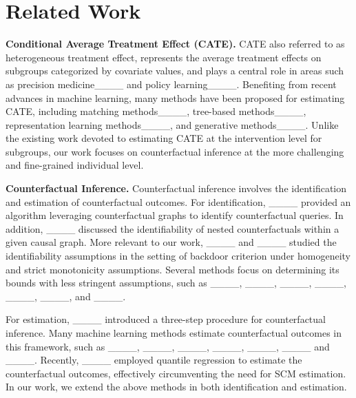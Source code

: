 \section{Related Work}
{\bf Conditional Average Treatment Effect (CATE).} 
 CATE also referred to as heterogeneous treatment effect, represents the average treatment effects on subgroups categorized by covariate values, and plays a central role in areas such as precision medicine____ and policy learning____. Benefiting from recent advances in machine learning, many methods have been proposed for estimating CATE, including matching methods____, tree-based methods____, representation learning methods____, and generative methods____. Unlike the existing work devoted to estimating CATE at the intervention level for subgroups, our work focuses on counterfactual inference at the more challenging and fine-grained individual level.
 
 
{\bf Counterfactual Inference.} Counterfactual inference involves the identification and estimation of counterfactual outcomes.
  For identification,  ____ provided an algorithm  leveraging counterfactual graphs to identify counterfactual queries. In addition, ____ discussed the identifiability of nested counterfactuals within a given causal graph. 
 More relevant to our work, 
  ____ and  ____ studied the identifiability assumptions in the setting of backdoor criterion under homogeneity and
strict monotonicity assumptions. 
Several methods focus on determining its bounds with less stringent assumptions, such as  ____, ____, ____, ____, ____, ____, and ____.  

 
 For estimation, ____  introduced a three-step procedure for counterfactual inference. Many machine learning methods estimate counterfactual outcomes in this framework, such as  ____, ____, ____, ____, ____, ____ and ____. 
 Recently, ____ employed quantile regression to estimate the counterfactual outcomes,  effectively circumventing the need for SCM estimation. 
 In our work, we extend the above methods in both identification and estimation. 


